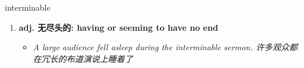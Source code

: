 
\begin{frame}
{\huge interminable}
\begin{center}
\begin{enumerate}\Large
  \item \textbf{adj. 无尽头的: having or seeming to have no end}
  \begin{itemize}
    \item \em{\Large{A large audience fell asleep during the interminable sermon. 许多观众都在冗长的布道演说上睡着了}}
  \end{itemize}
\end{enumerate}
\end{center}
\end{frame}
